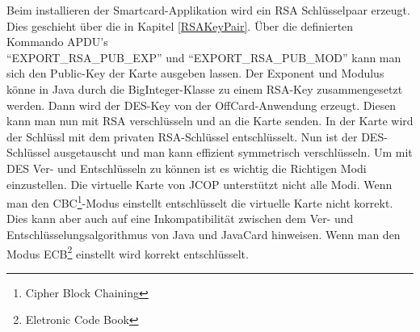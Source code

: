 \documentclass[parskip]{scrartcl}
\begin{document}
		\newpage
		Beim installieren der Smartcard-Applikation wird ein RSA Schlüsselpaar erzeugt. Dies geschieht über die in Kapitel \ref{RSAKeyPair}. Über die definierten Kommando APDU's \\\enquote{EXPORT\_RSA\_PUB\_EXP} und \enquote{EXPORT\_RSA\_PUB\_MOD} kann man sich den Pub\-lic-Key der Karte ausgeben lassen. Der Exponent und Modulus könne in Java durch die BigInteger-Klasse zu einem RSA-Key zusammengesetzt werden. Dann wird der DES-Key von der OffCard-Anwendung erzeugt. Diesen kann man nun mit RSA verschlüsseln und an die Karte senden. In der Karte wird der Schlüssl mit dem privaten RSA-Schlüssel entschlüsselt. Nun ist der DES-Schlüssel ausgetauscht und man kann effizient symmetrisch verschlüsseln. Um mit DES Ver- und Entschlüsseln zu können ist es wichtig die Richtigen Modi einzustellen. Die virtuelle Karte von JCOP unterstützt nicht alle Modi. Wenn man den CBC\footnote{Cipher Block Chaining}-Modus einstellt entschlüsselt die virtuelle Karte nicht korrekt. Dies kann aber auch auf eine Inkompatibilität zwischen dem Ver- und Entschlüsselungsalgorithmus von Java und JavaCard hinweisen. Wenn man den Modus ECB\footnote{Eletronic Code Book} einstellt wird korrekt entschlüsselt. 
\end{document}
